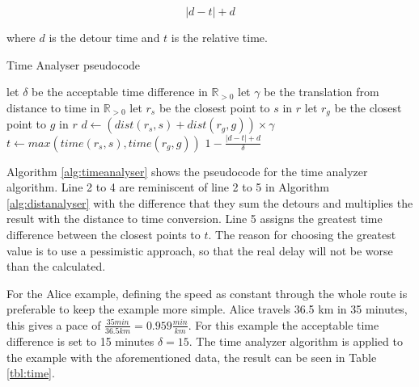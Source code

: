 \[ |d - t| + d \]

where $d$ is the detour time and $t$ is the relative time.

\iffalse
Now, let us consider what would happen on the return route.
The situation is now that the driver and passenger want to return to their original locations, but they want to leave at a specific time.
The algorithm already solves this because if a specific arrival time is defined a specific departure time must also be defined.
And the differences in time must be the same.
\fi

\begin{algorithm}
	\caption{Time Analyser pseudocode}
	\label{alg:timeanalyser}
	\begin{algorithmic}[1]
		\Require 
		\Statex let $\delta$ be the acceptable time difference in $\mathbb{R}_{>0}$
		\Statex let $\gamma$ be the translation from distance to time in $\mathbb{R}_{>0}$ 
		\Statex 
			\State let $r_s$ be the closest point to $s$ in $r$
			\State let $r_g$ be the closest point to $g$ in $r$
			\State $d \gets (dist(r_s,s) + dist(r_g,g))\times\gamma$
			\State $t \gets max(time(r_s, s), time(r_g, g))$
			\State\Return $1-\frac{|d - t| + d}{\delta}$
		\EndFunction
	\end{algorithmic}
\end{algorithm}

Algorithm \ref{alg:timeanalyser} shows the pseudocode for the time analyzer algorithm.
Line 2 to 4 are reminiscent of line 2 to 5 in Algorithm \ref{alg:distanalyser} with the difference that they sum the detours and multiplies the result with the distance to time conversion.
Line 5 assigns the greatest time difference between the closest points to $t$.
The reason for choosing the greatest value is to use a pessimistic approach, so that the real delay will not be worse than the calculated.

For the Alice example, defining the speed as constant through the whole route is preferable to keep the example more simple.
Alice travels 36.5 km in 35 minutes, this gives a pace of  $\frac{35 min}{36.5 km} = 0.959\frac{min}{km} $.
For this example the acceptable time difference is set to 15 minutes $\delta = 15$.
The time analyzer algorithm is applied to the example with the aforementioned data, the result can be seen in Table \ref{tbl:time}.

